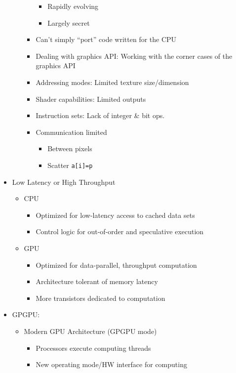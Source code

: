 \documentclass[a4paper]{article}
\newcommand{\inline}[1]{\lstinline!#1!}%
\begin{document}
\begin{itemize}
\begin{itemize}
\begin{itemize}
\begin{itemize}
\item Rapidly evolving 
\item Largely secret
\end{itemize}
\item Can't simply ``port'' code written for the CPU
\item Dealing with graphics API: Working with the corner cases of the graphics API
\item Addressing modes: Limited texture size/dimension
\item Shader capabilities: Limited outputs
\item Instruction sets: Lack of integer \& bit ops.
\item Communication limited
\begin{itemize}
\item Between pixels
\item Scatter \inline{a[i]=p}
\end{itemize}
\end{itemize}
\end{itemize}
\item Low Latency or High Throughput
\begin{itemize}
\item CPU
\begin{itemize}
\item Optimized for low-latency access to cached data sets
\item Control logic for out-of-order and speculative execution
\end{itemize}
\item GPU
\begin{itemize}
\item Optimized for data-parallel, throughput computation
\item Architecture tolerant of memory latency
\item More transistors dedicated to computation
\end{itemize}
\end{itemize}
\item GPGPU:
\begin{itemize}
\item Modern GPU Architecture (GPGPU mode)
\begin{itemize}
\item Processors execute computing threads
\item New operating mode/HW interface for computing 
\end{itemize}
\end{itemize}
\end{itemize}
\end{document}
